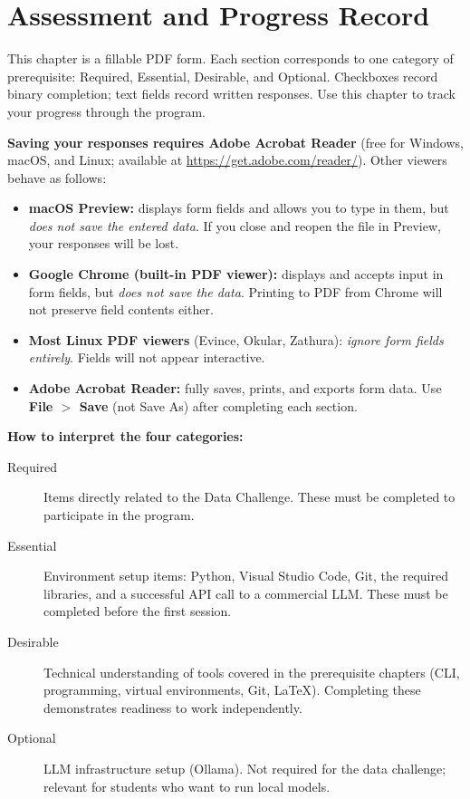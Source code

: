 \chapter{Assessment and Progress Record}
\label{ch:assessment}

\begin{Form}

This chapter is a fillable PDF form. Each section corresponds to one
category of prerequisite: Required, Essential, Desirable, and Optional.
Checkboxes record binary completion; text fields record written
responses. Use this chapter to track your progress through the program.

\vs
\noindent
\textbf{Saving your responses requires Adobe Acrobat Reader} (free for
Windows, macOS, and Linux; available at
\url{https://get.adobe.com/reader/}). Other viewers behave as follows:

\begin{itemize}
    \item \textbf{macOS Preview:} displays form fields and allows you
          to type in them, but \emph{does not save the entered data}.
          If you close and reopen the file in Preview, your responses
          will be lost.
    \item \textbf{Google Chrome (built-in PDF viewer):} displays and
          accepts input in form fields, but \emph{does not save the
          data}. Printing to PDF from Chrome will not preserve field
          contents either.
    \item \textbf{Most Linux PDF viewers} (Evince, Okular, Zathura):
          \emph{ignore form fields entirely}. Fields will not appear
          interactive.
    \item \textbf{Adobe Acrobat Reader:} fully saves, prints, and
          exports form data. Use \textbf{File $>$ Save} (not Save As)
          after completing each section.
\end{itemize}

\vs
\noindent
\textbf{How to interpret the four categories:}

\begin{description}
    \item[Required] Items directly related to the Data Challenge.
          These must be completed to participate in the program.
    \item[Essential] Environment setup items: Python, Visual Studio
          Code, Git, the required libraries, and a successful API
          call to a commercial LLM. These must be completed before
          the first session.
    \item[Desirable] Technical understanding of tools covered in the
          prerequisite chapters (CLI, programming, virtual
          environments, Git, \LaTeX{}). Completing these demonstrates
          readiness to work independently.
    \item[Optional] LLM infrastructure setup (Ollama). Not required
          for the data challenge; relevant for students who want to
          run local models.
\end{description}
\vs


\end{Form}

